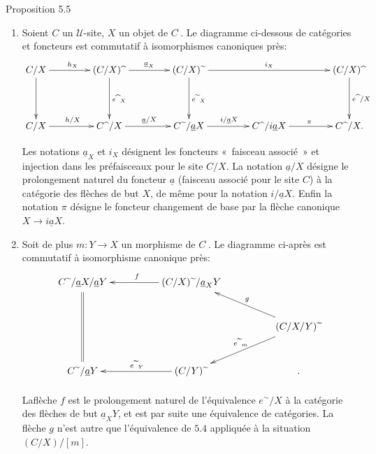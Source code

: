 \documentclass[10pt]{../fichiers-configuration-latex/smfart}
\begin{document}
\begin{enonce*}{Proposition 5.5}
\begin{enumerate}
\renewcommand{\labelenumi}{\theenumi)}
\item Soient $C$ un $𝒰$-site, $X$ un objet de
$C^{\widehat{\phantom{,}}}$. Le diagramme ci-dessous de
catégories et foncteurs est commutatif à isomorphismes
canoniques près:
\[
\xymatrix@C=1.5cm@R=1.5cm{ C/X \ar[r]^{h_X} \ar[d]&
(C/X)\widehat{\phantom{a}} \ar[d]^{e\widehat{\phantom{a}}_X}
\ar[r]^{\underline{a}_X}& (C/X)\widetilde{\phantom{a}} \ar[rr]^{i_X}
\ar[d]^{e\widetilde{\phantom{a}}_X}& &
(C/X)\widehat{\phantom{a}} \ar[d]^{e\widehat{\phantom{a}}/X}\\
C/X \ar[r]^{h/X}& C\widehat{\phantom{a}}/X \ar[r]^{\underline{a}/X}&
C\widetilde{\phantom{a}}/\underline{a}X \ar[r]^{i/\underline{a}X}&
C\widehat{\phantom{a}}/i\underline{a}X \ar[r]^{\pi}&
C\widehat{\phantom{a}}/X. }
\]

Les notations $\underline{a}_X$ et $i_X$ désignent les foncteurs « faisceau associé » et injection dans les préfaisceaux
pour le site $C/X$. La notation $\underline{a}/X$ désigne le
prolongement naturel du foncteur $\underline{a}$ (faisceau associé
pour le site $C$) à la catégorie des flèches de but $X$, de
même pour la notation $i/\underline{a}X$. Enfin la notation $\pi$
désigne le foncteur changement de base par la flèche canonique
$X\rightarrow i\underline{a}X$.

\item Soit de plus $m:Y\rightarrow X$ un morphisme de
$C^{\widehat{\phantom{,}}}$. Le diagramme ci-après est commutatif
à isomorphisme canonique près:
\[
\xymatrix@C=1.75cm@H=.5cm{ C\widetilde{\phantom{a}}
/\underline{a}X/\underline{a}Y \ar@{=}[dd]&
(C/X)\widetilde{\phantom{a}}/\underline{a}_X Y \ar[l]_{f}& \\
& & (C/X/Y)\widetilde{\phantom{a}} \ar[lu]_{g} \ar[ld]_{e\widetilde{\phantom{a}}_m}\\
C\widetilde{\phantom{a}}/\underline{a}Y & (C/Y)\widetilde{\phantom{a}}
\ar[l]_{e\widetilde{\phantom{a}}_Y}&. }
\]

La\pageoriginale flèche $f$ est le prolongement naturel de
l'équivalence $e^{\sim}/X$ à la catégorie des flèches de
but $\underline{a}_XY$, et est par suite une équivalence de
catégories. La flèche $g$ n'est autre que l'équivalence de
$\hyperref[III.prop5.4]{5.4}$ appliquée à la situation $(C/X)/[m]$.


\end{enumerate}
\end{enonce*}
\end{document}
